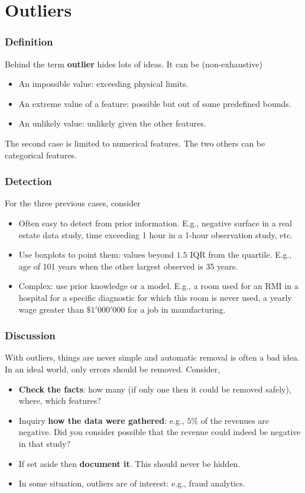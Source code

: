 \section{Outliers}
\begin{frame}
\frametitle{Definition}
Behind the term {\bf outlier} hides lots of ideas. It can be (non-exhaustive)
\begin{itemize}
\item An impossible value: exceeding physical limits.
\item An extreme value of a feature: possible but out of some predefined bounds. 
\item An unlikely value: unlikely given the other features.
\end{itemize}
The second case is limited to numerical features. The two others can be categorical features.
\end{frame}
\begin{frame}
\frametitle{Detection}
For the three previous cases, consider
\begin{itemize}
\item Often easy to detect from prior information. E.g., negative surface in a real estate data study, time exceeding 1 hour in a 1-hour observation study, etc. 
\item Use boxplots to point them: values beyond $1.5$ IQR from the quartile. E.g., age of 101 years when the other largest observed is 35 years.
\item Complex: use prior knowledge or a model. E.g., a room used for an RMI in a hospital for a specific diagnostic for which this room is never used, a yearly wage greater than $\$1'000'000$ for a job in manufacturing.
\end{itemize}
\end{frame}
\begin{frame}
\frametitle{Discussion}
With outliers, things are never simple and automatic removal is often a bad idea. In an ideal world, only errors should be removed. Consider,
\begin{itemize}
\item {\bf Check the facts}: how many (if only one then it could be removed safely), where, which features?
\item Inquiry {\bf how the data were gathered}: e.g., $5\%$ of the revenues are negative. Did you consider possible that the revenue could indeed be negative in that study?
\item If set aside then {\bf document it}. This should never be hidden.
\item In some situation, outliers are of interest: e.g., fraud analytics.
\end{itemize}
\end{frame}
